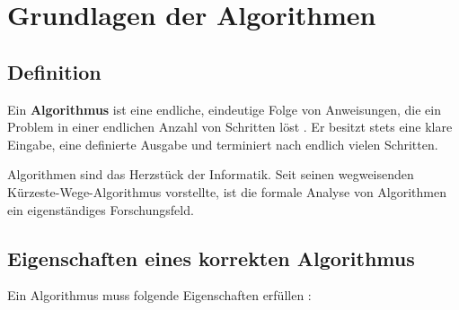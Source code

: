 
\section{Grundlagen der Algorithmen}

\subsection{Definition}

\begin{infobox}
Ein \textbf{Algorithmus} ist eine endliche, eindeutige Folge von Anweisungen,
die ein Problem in einer endlichen Anzahl von Schritten löst
\parencite{cormen2022}.
Er besitzt stets eine klare Eingabe, eine definierte Ausgabe und terminiert
nach endlich vielen Schritten.
\end{infobox}

Algorithmen sind das Herzstück der Informatik. Seit \textcite{dijkstra1959}
seinen wegweisenden Kürzeste-Wege-Algorithmus vorstellte, ist die formale
Analyse von Algorithmen ein eigenständiges Forschungsfeld.

\subsection{Eigenschaften eines korrekten Algorithmus}

Ein Algorithmus muss folgende Eigenschaften erfüllen \parencite{cormen2022}:

\begin{process}
\end{process}

